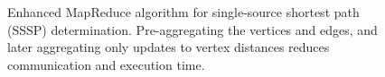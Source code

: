 \begin{figure}[htb]
\begin{center}
{\begin{minipage}{\textwidth}
\begin{tabbing}
  \end{tabbing}
 \end{minipage}}\end{center}

 \caption{Enhanced MapReduce algorithm for single-source shortest path (SSSP)
 determination.  Pre-aggregating the vertices and edges, and later aggregating only updates to vertex distances reduces communication and execution time.}

 \label{fig:sssp2}
\end{figure}

